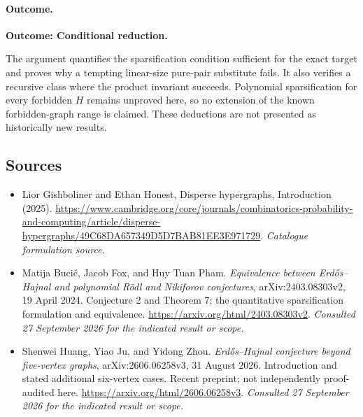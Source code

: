 \documentclass[11pt,a4paper]{article}
\numberwithin{equation}{section}
\begin{document}
\paragraph{Outcome.}
\textbf{Outcome: Conditional reduction.}

The argument quantifies the sparsification condition sufficient for
the exact target and proves why a tempting linear-size pure-pair
substitute fails.  It also verifies a recursive class where the product
invariant succeeds.  Polynomial sparsification for every forbidden
$H$ remains unproved here, so no extension of the known forbidden-graph
range is claimed.  These deductions are not presented as historically
new results.
\subsection{Sources}
\begin{itemize}\raggedright
\item[\textnormal{[S1]}]\hypertarget{source:3281:1}{} Lior Gishboliner and Ethan Honest, Disperse hypergraphs, Introduction (2025).
\url{https://www.cambridge.org/core/journals/combinatorics-probability-and-computing/article/disperse-hypergraphs/49C68DA657349D5D7BAB81EE3E971729}.
{\small\textit{Catalogue formulation source.}}
\item[\textnormal{[E1]}]\hypertarget{extra:3281:1}{} Matija Buci\'c, Jacob Fox, and Huy Tuan Pham.
\emph{Equivalence between Erd\H{o}s--Hajnal and polynomial R\"odl and Nikiforov conjectures}, arXiv:2403.08303v2, 19 April 2024. Conjecture 2 and Theorem 7; the quantitative sparsification formulation and equivalence.
\url{https://arxiv.org/html/2403.08303v2}.
{\small\textit{Consulted 27 September 2026 for the indicated result or scope.}}
\item[\textnormal{[E2]}]\hypertarget{extra:3281:2}{} Shenwei Huang, Yiao Ju, and Yidong Zhou.
\emph{Erd\H{o}s--Hajnal conjecture beyond five-vertex graphs}, arXiv:2606.06258v3, 31 August 2026. Introduction and stated additional six-vertex cases. Recent preprint; not independently proof-audited here.
\url{https://arxiv.org/html/2606.06258v3}.
{\small\textit{Consulted 27 September 2026 for the indicated result or scope.}}
\end{itemize}
\end{document}
